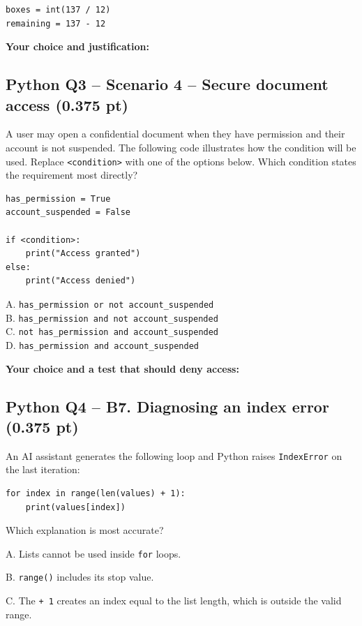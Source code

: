 \documentclass[10pt]{article}
\begin{document}
\begin{verbatim}
boxes = int(137 / 12)
remaining = 137 - 12
\end{verbatim}

\textbf{Your choice and justification:}


\clearpage
\subsection*{Python Q3 -- Scenario 4 -- Secure document access (0.375 pt)}
A user may open a confidential document when they have permission and
their account is not suspended. The following code illustrates how the
condition will be used. Replace \texttt{<condition>} with one of the
options below. Which condition states the requirement most directly?

\begin{verbatim}
has_permission = True
account_suspended = False

if <condition>:
    print("Access granted")
else:
    print("Access denied")
\end{verbatim}

A. \texttt{has\_permission\ or\ not\ account\_suspended}\\
B. \texttt{has\_permission\ and\ not\ account\_suspended}\\
C. \texttt{not\ has\_permission\ and\ account\_suspended}\\
D. \texttt{has\_permission\ and\ account\_suspended}

\textbf{Your choice and a test that should deny access:}


\subsection*{Python Q4 -- B7. Diagnosing an index error (0.375 pt)}
An AI assistant generates the following loop and Python raises
\texttt{IndexError} on the last iteration:

\begin{verbatim}
for index in range(len(values) + 1):
    print(values[index])
\end{verbatim}

Which explanation is most accurate?

A. Lists cannot be used inside \texttt{for} loops.

B. \texttt{range()} includes its stop value.

C. The \texttt{+\ 1} creates an index equal to the list length, which is
outside the valid range.
\end{document}

